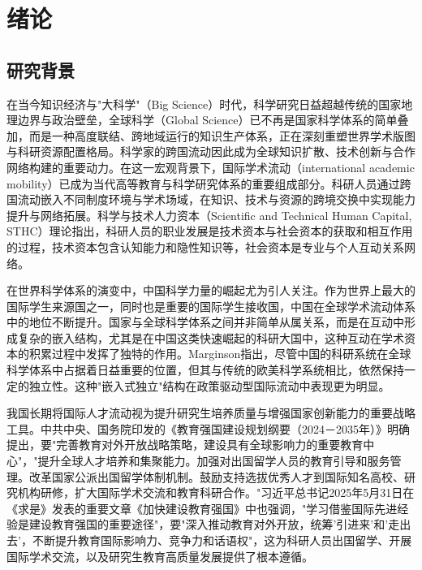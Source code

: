 \chapter{绪论}

\section{研究背景}

在当今知识经济与"大科学"（Big Science）时代，科学研究日益超越传统的国家地理边界与政治壁垒，全球科学（Global Science）已不再是国家科学体系的简单叠加，而是一种高度联结、跨地域运行的知识生产体系，正在深刻重塑世界学术版图与科研资源配置格局\cite{limei2025, marginson2022}。科学家的跨国流动因此成为全球知识扩散、技术创新与合作网络构建的重要动力\cite{liu2024}。在这一宏观背景下，国际学术流动（international academic mobility）已成为当代高等教育与科学研究体系的重要组成部分。科研人员通过跨国流动嵌入不同制度环境与学术场域，在知识、技术与资源的跨境交换中实现能力提升与网络拓展。科学与技术人力资本（Scientific and Technical Human Capital, STHC）理论指出，科研人员的职业发展是技术资本与社会资本的获取和相互作用的过程\cite{canibano2019}，技术资本包含认知能力和隐性知识等，社会资本是专业与个人互动关系网络\cite{canibano2019}。

在世界科学体系的演变中，中国科学力量的崛起尤为引人关注。作为世界上最大的国际学生来源国之一，同时也是重要的国际学生接收国，中国在全球学术流动体系中的地位不断提升\cite{yang2022}。国家与全球科学体系之间并非简单从属关系，而是在互动中形成复杂的嵌入结构，尤其是在中国这类快速崛起的科研大国中，这种互动在学术资本的积累过程中发挥了独特的作用\cite{marginson2021}。Marginson指出，尽管中国的科研系统在全球科学体系中占据着日益重要的位置，但其与传统的欧美科学系统相比，依然保持一定的独立性。这种"嵌入式独立"结构在政策驱动型国际流动中表现更为明显\cite{marginson2022}。

我国长期将国际人才流动视为提升研究生培养质量与增强国家创新能力的重要战略工具。中共中央、国务院印发的《教育强国建设规划纲要（2024－2035年）》明确提出，要"完善教育对外开放战略策略，建设具有全球影响力的重要教育中心"，"提升全球人才培养和集聚能力。加强对出国留学人员的教育引导和服务管理。改革国家公派出国留学体制机制。鼓励支持选拔优秀人才到国际知名高校、研究机构研修，扩大国际学术交流和教育科研合作。"习近平总书记2025年5月31日在《求是》发表的重要文章《加快建设教育强国》中也强调，"学习借鉴国际先进经验是建设教育强国的重要途径"，要"深入推动教育对外开放，统筹'引进来'和'走出去'，不断提升教育国际影响力、竞争力和话语权"，这为科研人员出国留学、开展国际学术交流，以及研究生教育高质量发展提供了根本遵循。

